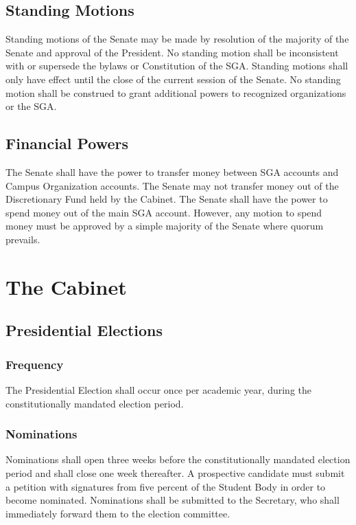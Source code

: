 \documentclass[12pt]{scrreprt}
\begin{document}
\section{Standing Motions}
Standing motions of the Senate may be made by resolution of the majority of 
the Senate and approval of the President. No standing motion shall be 
inconsistent with or supersede the bylaws or Constitution of the SGA. Standing 
motions shall only have effect until the close of the current session of the 
Senate. No standing motion shall be construed to grant additional powers to 
recognized organizations or the SGA. 

\section{Financial Powers}
The Senate shall have the power to transfer money between SGA accounts and 
Campus Organization accounts. The Senate may not transfer money out of the 
Discretionary Fund held by the Cabinet. The Senate shall have the power to 
spend money out of the main SGA account. However, any motion to spend money must be approved by a simple majority of the Senate where quorum prevails. 

\chapter{The Cabinet}

\section{Presidential Elections}

\subsection{Frequency}
The Presidential Election shall occur once per academic year, during the 
constitutionally mandated election period. 

\subsection{Nominations}
Nominations shall open three weeks before the constitutionally mandated 
election period and shall close one week thereafter. A prospective candidate 
must submit a petition with signatures from five percent of the Student Body 
in order to become nominated. Nominations shall be submitted to the Secretary, 
who shall immediately forward them to the election committee. 
\end{document}
